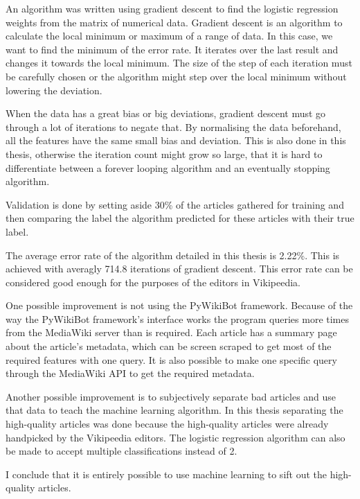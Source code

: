 \documentclass[a4paper, titlepage, 12pt]{article}
\begin{document}
An algorithm was written using gradient descent to find the logistic regression
weights from the matrix of numerical data. Gradient descent is an algorithm to
calculate the local minimum or maximum of a range of data. In this case, we want
to find the minimum of the error rate. It iterates over the last result and
changes it towards the local minimum. The size of the step of each iteration
must be carefully chosen or the algorithm might step over the local minimum
without lowering the deviation.

When the data has a great bias or big deviations, gradient descent must go
through a lot of iterations to negate that. By normalising the data beforehand,
all the features have the same small bias and deviation. This is also done in
this thesis, otherwise the iteration count might grow so large, that it is hard
to differentiate between a forever looping algorithm and an eventually stopping
algorithm.

Validation is done by setting aside 30\% of the articles gathered for training
and then comparing the label the algorithm predicted for these articles with
their true label.

The average error rate of the algorithm detailed in this thesis is 2.22\%. This
is achieved with averagly 714.8 iterations of gradient descent. This error rate
can be considered good enough for the purposes of the editors in Vikipeedia.

One possible improvement is not using the PyWikiBot framework. Because of the
way the PyWikiBot framework's interface works the program queries more times from
the MediaWiki server than is required. Each article has a summary page about the
article's metadata, which can be screen scraped to get most of the required
features with one query. It is also possible to make one specific query through
the MediaWiki API to get the required metadata.

Another possible improvement is to subjectively separate bad articles
and use that data to teach the machine learning algorithm. In this thesis
separating the high-quality articles was done because the high-quality articles
were already handpicked by the Vikipeedia editors. The logistic regression
algorithm can also be made to accept multiple classifications instead of 2.

I conclude that it is entirely possible to use machine learning to sift out
the high-quality articles.



\end{document}
